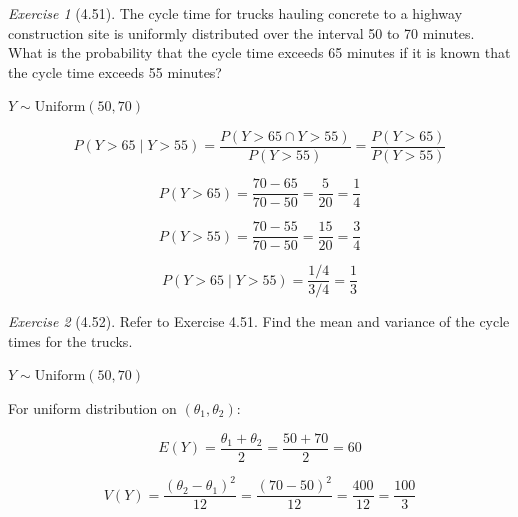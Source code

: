 \documentclass[12pt]{amsart}
\makeatletter
\theoremstyle{remark}
\newtheorem*{exercise}{Exercise}%
\renewenvironment{proof}[1][\proofname]{\par\doublespacing
  \pushQED{\qed}%
  \normalfont \topsep6\p@\@plus6\p@\relax
  \list{}{%
    \settowidth{\leftmargin}{\itshape\proofname:\hskip\labelsep}%
    \setlength{\labelwidth}{0pt}%
    \setlength{\itemindent}{-\leftmargin}%
  }%
  \item[\hskip\labelsep\itshape#1\@addpunct{:}]\ignorespaces
}{%
  \popQED\endlist\@endpefalse
  \singlespacing
}
\theoremstyle{mycomment}
\makeatother
\begin{document}
\begin{exercise}[4.51]
The cycle time for trucks hauling concrete to a highway construction site is uniformly distributed over the interval 50 to 70 minutes. What is the probability that the cycle time exceeds 65 minutes if it is known that the cycle time exceeds 55 minutes?

\begin{proof}[Solution]
$Y \sim \text{Uniform}(50, 70)$

$$P(Y > 65 \mid Y > 55) = \frac{P(Y > 65 \cap Y > 55)}{P(Y > 55)} = \frac{P(Y > 65)}{P(Y > 55)}$$

$$P(Y > 65) = \frac{70 - 65}{70 - 50} = \frac{5}{20} = \frac{1}{4}$$

$$P(Y > 55) = \frac{70 - 55}{70 - 50} = \frac{15}{20} = \frac{3}{4}$$

$$P(Y > 65 \mid Y > 55) = \frac{1/4}{3/4} = \frac{1}{3}$$
\end{proof}
\end{exercise}
\begin{exercise}[4.52]
Refer to Exercise 4.51. Find the mean and variance of the cycle times for the trucks.

\begin{proof}[Solution]
$Y \sim \text{Uniform}(50, 70)$

For uniform distribution on $(\theta_1, \theta_2)$:

$$E(Y) = \frac{\theta_1 + \theta_2}{2} = \frac{50 + 70}{2} = 60$$

$$V(Y) = \frac{(\theta_2 - \theta_1)^2}{12} = \frac{(70 - 50)^2}{12} = \frac{400}{12} = \frac{100}{3}$$
\end{proof}
\end{exercise}
 
\end{document}
